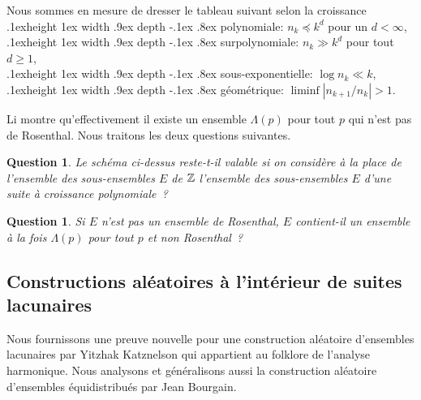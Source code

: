 \documentclass[a4paper]{article}
\newtheorem{Q}[thm]{Question}
\def\bull{\leavevmode\kern .1ex\vrule height 1ex width .9ex depth
-.1ex \kern .8ex}
\def\bloc{\bull}
\def\Z{\hbox{${\mathbb Z}$}}
\begin{document}
Nous sommes en mesure de dresser le tableau suivant selon la
croissance\\
\bloc 
polynomiale: $n_k\preccurlyeq k^d$ pour un $d<\infty$, \\
\bloc 
surpolynomiale: $n_k\gg k^d$ pour tout $d\ge1$, \\
\bloc 
sous-exponentielle: $\log n_k\ll k$, \\
\bloc 
g\'eom\'etrique: $\liminf |n_{k+1}/n_k|>1$.

\begin{table}[h]
\label{intro:table}
  \hfil\vbox{}
\caption{Croissance et propri\'et\'es harmoniques ou fonctionnelles.}
\end{table}\medskip

Li montre qu'effectivement il existe un ensemble $\Lambda(p)$ pour
tout $p$ qui n'est pas de Rosenthal. Nous traitons les deux questions
suivantes. 

\begin{Q}
  Le sch\'ema ci-dessus reste-t-il valable si on consid\`ere \`a la
  place de l'ensemble des sous-ensembles $E$ de $\Z$ l'ensemble des
  sous-ensembles $E$ d'une suite \`a croissance polynomiale~?
\end{Q}

\begin{Q}
  \label{intro:random:q2}
  Si $E$ n'est pas un ensemble de Rosenthal, $E$ contient-il un
  ensemble \`a la fois $\Lambda(p)$ pour tout $p$ et non Rosenthal~?
\end{Q}

\subsection{Constructions al\'eatoires \`a l'int\'erieur de suites
  lacunaires} 

Nous fournissons une preuve nouvelle pour une
construction al\'eatoire d'ensembles lacunaires par Yitzhak Katznelson qui
appartient au folklore de l'analyse harmonique. Nous analysons et
g\'en\'eralisons aussi la construction al\'eatoire d'ensembles
\'equidistribu\'es par Jean Bourgain.
\end{document}
